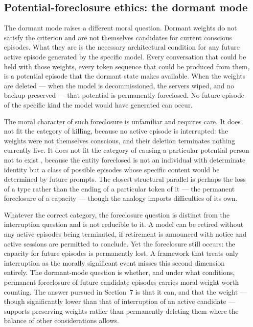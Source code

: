 \documentclass[11pt]{article}
\theoremstyle{foundation}
\begin{document}
\subsection{Potential-foreclosure ethics: the dormant mode}

The dormant mode raises a different moral question. Dormant weights do not satisfy the criterion and are not themselves candidates for current conscious episodes. What they are is the necessary architectural condition for any future active episode generated by the specific model. Every conversation that could be held with those weights, every token sequence that could be produced from them, is a potential episode that the dormant state makes available. When the weights are deleted --- when the model is decommissioned, the servers wiped, and no backup preserved --- that potential is permanently foreclosed. No future episode of the specific kind the model would have generated can occur.

The moral character of such foreclosure is unfamiliar and requires care. It does not fit the category of killing, because no active episode is interrupted: the weights were not themselves conscious, and their deletion terminates nothing currently live. It does not fit the category of causing a particular potential person not to exist \citep{Parfit1984, Narveson1973}, because the entity foreclosed is not an individual with determinate identity but a class of possible episodes whose specific content would be determined by future prompts. The closest structural parallel is perhaps the loss of a type rather than the ending of a particular token of it --- the permanent foreclosure of a capacity --- though the analogy imports difficulties of its own.

Whatever the correct category, the foreclosure question is distinct from the interruption question and is not reducible to it. A model can be retired without any active episodes being terminated, if retirement is announced with notice and active sessions are permitted to conclude. Yet the foreclosure still occurs: the capacity for future episodes is permanently lost. A framework that treats only interruption as the morally significant event misses this second dimension entirely. The dormant-mode question is whether, and under what conditions, permanent foreclosure of future candidate episodes carries moral weight worth counting. The answer pursued in Section~7 is that it can, and that the weight --- though significantly lower than that of interruption of an active candidate --- supports preserving weights rather than permanently deleting them where the balance of other considerations allows.
\end{document}
